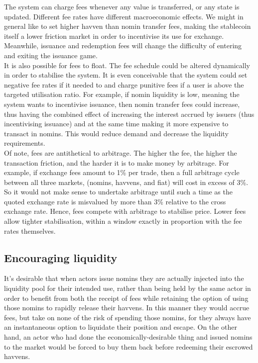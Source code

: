 The system can charge fees whenever any value is transferred, or any state is updated.
\noindent Different fee rates have different macroeconomic effects. We might in general like to set higher havven than nomin transfer fees, making the stablecoin itself a lower friction market in order to incentivise its use for exchange. Meanwhile, issuance and redemption fees will change the difficulty of entering and exiting the issuance game. \\

\noindent It is also possible for fees to float. The fee schedule could be altered dynamically in order to stabilise the system. It is even conceivable that the system could set negative fee rates if it needed to and charge punitive fees if a user is above the targeted utilisation ratio. For example, if nomin liquidity is low, meaning the system wants to incentivise issuance, then nomin transfer fees could increase, thus having the combined effect of increasing the interest accrued by issuers (thus incentivising issuance) and at the same time making it more expensive to transact in nomins. This would reduce demand and decrease the liquidity requirements. \\

\noindent Of note, fees are antithetical to arbitrage. The higher the fee, the higher the transaction friction, and the harder it is to make money by arbitrage. For example, if exchange fees amount to 1\% per trade, then a full arbitrage cycle between all three markets, (nomins, havvens, and fiat) will cost in excess of 3\%. So it would not make sense to undertake arbitrage until such a time as the quoted exchange rate is misvalued by more than 3\% relative to the cross exchange rate. Hence, fees compete with arbitrage to stabilise price. Lower fees allow tighter stabilisation, within a window exactly in proportion with the fee rates themselves.

\subsection{Encouraging liquidity}

\noindent It's desirable that when actors issue nomins they are actually injected into the liquidity pool for their intended use,
rather than being held by the same actor in order to benefit from both the receipt of fees while retaining the option of using those nomins to rapidly release their havvens.
In this manner they would accrue fees, but take on none of the risk of spending those nomins, for they always have an instantaneous option to liquidate their position and escape.
On the other hand, an actor who had done the economically-desirable thing and issued nomins to the market would be forced to buy them back before redeeming their escrowed havvens.

